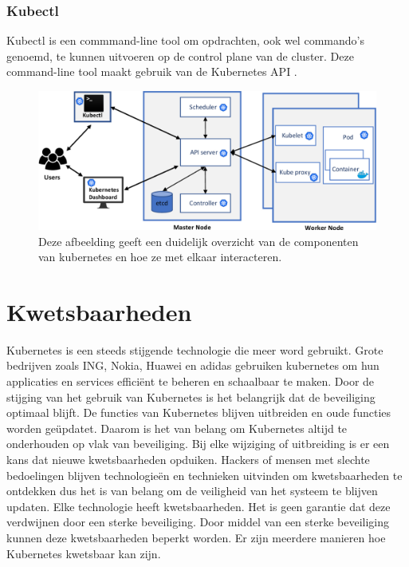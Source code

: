 \subsubsection{Kubectl}
Kubectl is een commmand-line tool om opdrachten, ook wel commando's genoemd, te kunnen uitvoeren op de control plane van de cluster.
Deze command-line tool maakt gebruik van de Kubernetes API \autocite{KubernetesDocs-2023}.

\begin{flushleft}
    \begin{figure}[h]
        \includegraphics[width=.70\textwidth]{graphics/3-Figure1-1.png}
        \caption{\label{fig:KubernetesOverview}Deze afbeelding geeft een duidelijk overzicht van de componenten van kubernetes en hoe ze met elkaar interacteren.  \autocite{shamim2020xi}}
    \end{figure} 
\end{flushleft}


\section{Kwetsbaarheden}
Kubernetes is een steeds stijgende technologie die meer word gebruikt. \autocite{KubernetesDocs-2023} Grote bedrijven zoals ING, Nokia, Huawei en adidas gebruiken kubernetes om hun applicaties en services efficiënt te beheren en schaalbaar te maken. Door de stijging van het gebruik van Kubernetes is het belangrijk dat de beveiliging optimaal blijft. De functies van Kubernetes blijven uitbreiden en oude functies worden geüpdatet. Daarom is het van belang om Kubernetes altijd te onderhouden op vlak van beveiliging. Bij elke wijziging of uitbreiding is er een kans dat nieuwe kwetsbaarheden opduiken. Hackers of mensen met slechte bedoelingen blijven technologieën en technieken uitvinden om kwetsbaarheden te ontdekken dus het is van belang om de veiligheid van het systeem te blijven updaten. Elke technologie heeft kwetsbaarheden. Het is geen garantie dat deze verdwijnen door een sterke beveiliging.
Door middel van een sterke beveiliging kunnen deze kwetsbaarheden beperkt worden. 
Er zijn meerdere manieren hoe Kubernetes kwetsbaar kan zijn. 


